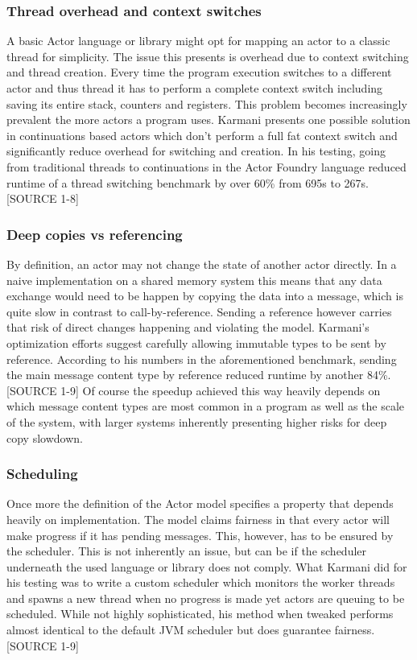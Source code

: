 \documentclass[A4]{article}
\begin{document}
\subsubsection{Thread overhead and context switches}
A basic Actor language or library might opt for mapping an actor to a classic thread for simplicity. The issue this presents is overhead due to context switching and thread creation. Every time the program execution switches to a different actor and thus thread it has to perform a complete context switch including saving its entire stack, counters and registers. This problem becomes increasingly prevalent the more actors a program uses. Karmani presents one possible solution in continuations based actors which don't perform a full fat context switch and significantly reduce overhead for switching and creation. In his testing, going from traditional threads to continuations in the Actor Foundry language reduced runtime of a thread switching benchmark by over 60\% from 695s to 267s. [SOURCE 1-8]
\subsubsection{Deep copies vs referencing}
By definition, an actor may not change the state of another actor directly. In a naive implementation on a shared memory system this means that any data exchange would need to be happen by copying the data into a message, which is quite slow in contrast to call-by-reference. Sending a reference however carries that risk of direct changes happening and violating the model. Karmani's optimization efforts suggest carefully allowing immutable types to be sent by reference. According to his numbers in the aforementioned benchmark, sending the main message content type by reference reduced runtime by another 84\%. [SOURCE 1-9]
Of course the speedup achieved this way heavily depends on which message content types are most common in a program as well as the scale of the system, with larger systems inherently presenting higher risks for deep copy slowdown.
\subsubsection{Scheduling}
Once more the definition of the Actor model specifies a property that depends heavily on implementation. The model claims fairness in that every actor will make progress if it has pending messages. This, however, has to be ensured by the scheduler. This is not inherently an issue, but can be if the scheduler underneath the used language or library does not comply. What Karmani did for his testing was to write a custom scheduler which monitors the worker threads and spawns a new thread when no progress is made yet actors are queuing to be scheduled. While not highly sophisticated, his method when tweaked performs almost identical to the default JVM scheduler but does guarantee fairness. [SOURCE 1-9]
\end{document}
